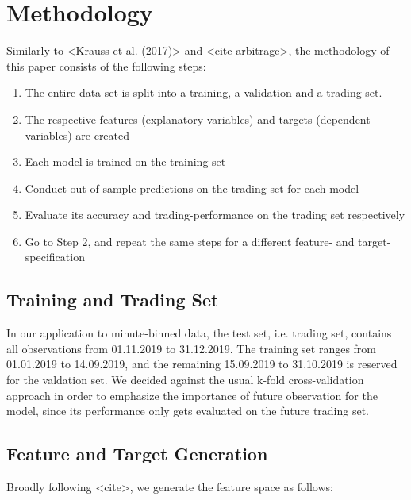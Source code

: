 \section{Methodology}
Similarly to <Krauss et al. (2017)> and <cite arbitrage>, the methodology of this paper consists of
the following steps:

\begin{enumerate}
    \item The entire data set is split into a training, a validation and a trading set.
    \item The respective features (explanatory variables) and targets (dependent variables) are created
    \item Each model is trained on the training set
    \item Conduct out-of-sample predictions on the trading set for each model 
    \item Evaluate its accuracy and trading-performance on the trading set respectively
    \item Go to Step 2, and repeat the same steps for a different feature- and target-specification
  \end{enumerate}


\subsection{Training and Trading Set}
In our application to minute-binned data, the test set, i.e. trading set, contains all observations from 01.11.2019 to 31.12.2019.
The training set ranges from 01.01.2019 to 14.09.2019, and the remaining 15.09.2019 to 31.10.2019 
is reserved for the valdation set. We decided against the usual k-fold cross-validation approach 
in order to emphasize the importance of future observation for the model, since its performance only gets
evaluated on the future trading set.

\subsection{Feature and Target Generation}
Broadly following <cite>, we generate the feature space as follows:


